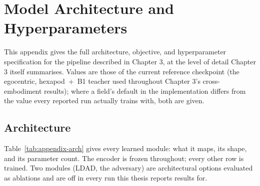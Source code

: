 \documentclass[12pt,a4paper,oneside]{report}
\begin{document}
\appendix
\renewcommand{\chaptername}{Appendix}
\chapter{Model Architecture and Hyperparameters}

This appendix gives the full architecture, objective, and hyperparameter specification for the
pipeline described in Chapter 3, at the level of detail Chapter 3 itself summarises. Values are those
of the current reference checkpoint (the egocentric, hexapod~+~B1 teacher used throughout Chapter 3's
cross-embodiment results); where a field's default in the implementation differs from the value every
reported run actually trains with, both are given.

\section{Architecture}
Table~\ref{tab:appendix-arch} gives every learned module: what it maps, its shape, and its parameter
count. The encoder is frozen throughout; every other row is trained. Two modules (LDAD, the
adversary) are architectural options evaluated as ablations and are off in every run this thesis
reports results for.
\end{document}
